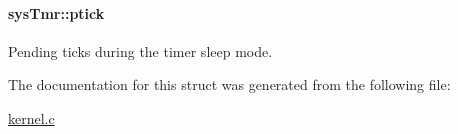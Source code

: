 \hypertarget{structsysTmr_a338f10146bdac2bdd69447fca0fe75f8}{
\paragraph[{ptick}]{ sys\-Tmr\-::ptick}}\label{structsysTmr_a338f10146bdac2bdd69447fca0fe75f8}


Pending ticks during the timer sleep mode. 



The documentation for this struct was generated from the following file\-:\begin{DoxyCompactItemize}
\item 
\hyperlink{kernel_8c}{kernel.\-c}\end{DoxyCompactItemize}
